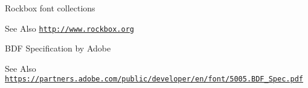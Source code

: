 \begin{DoxyParagraph}{Rockbox font collections}

\end{DoxyParagraph}
\begin{DoxySeeAlso}{See Also}
\href{http://www.rockbox.org}{\tt http\-://www.\-rockbox.\-org}
\end{DoxySeeAlso}


 \begin{DoxyParagraph}{B\-D\-F Specification by Adobe}

\end{DoxyParagraph}
\begin{DoxySeeAlso}{See Also}
\href{https://partners.adobe.com/public/developer/en/font/5005.BDF_Spec.pdf}{\tt https\-://partners.\-adobe.\-com/public/developer/en/font/5005.\-B\-D\-F\-\_\-\-Spec.\-pdf} 
\end{DoxySeeAlso}
